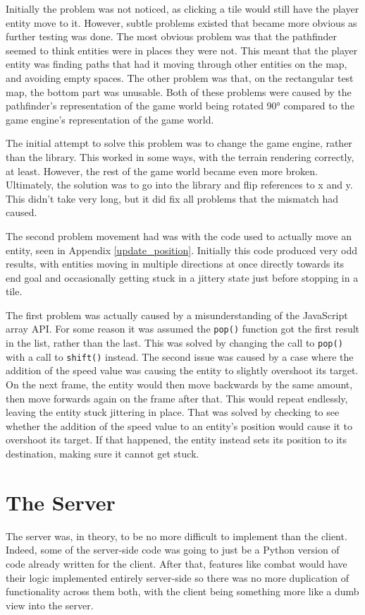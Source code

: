 Initially the problem was not noticed, as clicking a tile would still have the player entity move to it. However, subtle problems existed that became more obvious as further testing was done. The most obvious problem was that the pathfinder seemed to think entities were in places they were not. This meant that the player entity was finding paths that had it moving through other entities on the map, and avoiding empty spaces. The other problem was that, on the rectangular test map, the bottom part was unusable. Both of these problems were caused by the pathfinder's representation of the game world being rotated 90° compared to the game engine's representation of the game world.

The initial attempt to solve this problem was to change the game engine, rather than the library. This worked in some ways, with the terrain rendering correctly, at least. However, the rest of the game world became even more broken. Ultimately, the solution was to go into the library and flip references to x and y. This didn't take very long, but it did fix all problems that the mismatch had caused.

The second problem movement had was with the code used to actually move an entity, seen in Appendix \ref{update_position}. Initially this code produced very odd results, with entities moving in multiple directions at once directly towards its end goal and occasionally getting stuck in a jittery state just before stopping in a tile.

The first problem was actually caused by a misunderstanding of the JavaScript array API. For some reason it was assumed the \texttt{pop()} function got the first result in the list, rather than the last. This was solved by changing the call to \texttt{pop()} with a call to \texttt{shift()} instead. The second issue was caused by a case where the addition of the speed value was causing the entity to slightly overshoot its target. On the next frame, the entity would then move backwards by the same amount, then move forwards again on the frame after that. This would repeat endlessly, leaving the entity stuck jittering in place. That was solved by checking to see whether the addition of the speed value to an entity's position would cause it to overshoot its target. If that happened, the entity instead sets its position to its destination, making sure it cannot get stuck.

\section{The Server}\label{server_implementation}
The server was, in theory, to be no more difficult to implement than the client. Indeed, some of the server-side code was going to just be a Python version of code already written for the client. After that, features like combat would have their logic implemented entirely server-side so there was no more duplication of functionality across them both, with the client being something more like a dumb view into the server.

